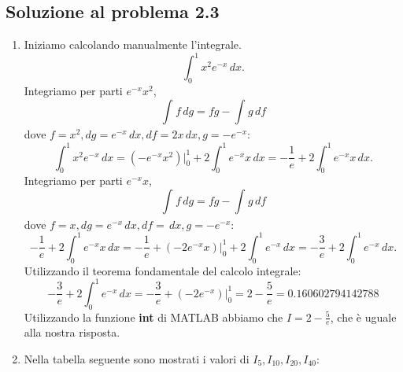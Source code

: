 \documentclass[a4paper,12pt]{article}
\begin{document}
\subsection{Soluzione al problema 2.3}
\begin{enumerate}[label=(\alph*)]

\item Iniziamo calcolando manualmente l'integrale.
\begin{equation*}
\int_{0}^{1} x^2e^{-x}\,dx.
\end{equation*}
Integriamo per parti $e^{-x}x^2$,
\begin{equation*}
\int_{}^{} f \,dg=fg - \int_{}^{} g\,df
\end{equation*}
dove $f=x^2, dg=e^{-x}\,dx, df=2x\,dx, g=-e^{-x}: $
\begin{equation*}
\int_{0}^{1} x^2e^{-x}\,dx=(-e^{-x}x^2)\Big|_{0}^{1}+2\int_{0}^{1}e^{-x}x\,dx= -\frac{1}{e}+2\int_{0}^{1}e^{-x}x\,dx.
\end{equation*}
Integriamo per parti $e^{-x}x$,
\begin{equation*}
\int_{}^{} f \,dg=fg - \int_{}^{} g\,df
\end{equation*}
dove $f=x, dg=e^{-x}\,dx, df=\,dx, g=-e^{-x}: $
\begin{equation*}
-\frac{1}{e}+2\int_{0}^{1}e^{-x}x\,dx=-\frac{1}{e}+(-2e^{-x}x)\Big|_{0}^{1}+2\int_{0}^{1}e^{-x}\,dx=  -\frac{3}{e}+2\int_{0}^{1}e^{-x}\,dx.
\end{equation*}
Utilizzando il teorema fondamentale del calcolo integrale:
\begin{equation*}
-\frac{3}{e}+2\int_{0}^{1}e^{-x}\,dx=-\frac{3}{e}+(-2e^{-x})\Big|_{0}^{1}=2-\frac{5}{e}=0.160602794142788
\end{equation*}
Utilizzando la funzione \textbf{int} di MATLAB abbiamo che $I=2-\frac{5}{e}$, che è uguale alla nostra risposta.

\item Nella tabella seguente sono mostrati i valori di $I_5,I_{10},I_{20},I_{40}$:


\end{enumerate}
\end{document}
